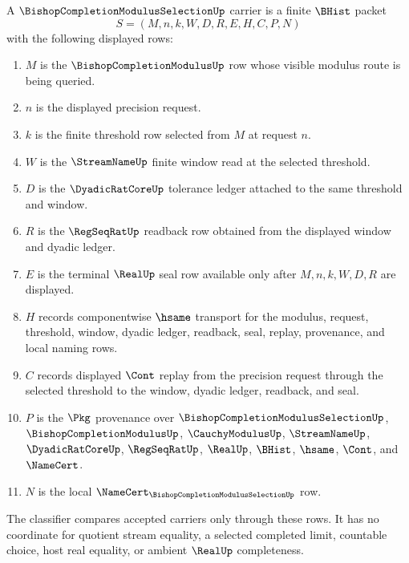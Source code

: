 \begin{definition}
\label{def:bishop-completion-modulus-selection-carrier}
A $\BishopCompletionModulusSelectionUp$ carrier is a finite $\BHist$ packet
$$
S=(M,n,k,W,D,R,E,H,C,P,N)
$$
with the following displayed rows:
\begin{enumerate}
\item $M$ is the $\BishopCompletionModulusUp$ row whose visible modulus route is being queried.
\item $n$ is the displayed precision request.
\item $k$ is the finite threshold row selected from $M$ at request $n$.
\item $W$ is the $\StreamNameUp$ finite window read at the selected threshold.
\item $D$ is the $\DyadicRatCoreUp$ tolerance ledger attached to the same threshold and window.
\item $R$ is the $\RegSeqRatUp$ readback row obtained from the displayed window and dyadic ledger.
\item $E$ is the terminal $\RealUp$ seal row available only after $M,n,k,W,D,R$ are displayed.
\item $H$ records componentwise $\hsame$ transport for the modulus, request, threshold, window, dyadic ledger, readback, seal, replay, provenance, and local naming rows.
\item $C$ records displayed $\Cont$ replay from the precision request through the selected threshold to the window, dyadic ledger, readback, and seal.
\item $P$ is the $\Pkg$ provenance over $\BishopCompletionModulusSelectionUp$, $\BishopCompletionModulusUp$, $\CauchyModulusUp$, $\StreamNameUp$, $\DyadicRatCoreUp$, $\RegSeqRatUp$, $\RealUp$, $\BHist$, $\hsame$, $\Cont$, and $\NameCert$.
\item $N$ is the local $\NameCert_{\BishopCompletionModulusSelectionUp}$ row.
\end{enumerate}
The classifier compares accepted carriers only through these rows. It has no coordinate for quotient stream equality, a selected completed limit, countable choice, host real equality, or ambient $\RealUp$ completeness.
\end{definition}

